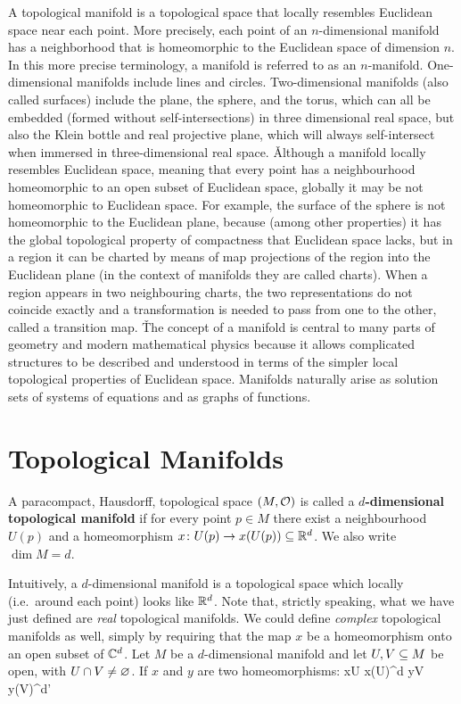 A topological manifold is a topological space that locally resembles Euclidean space near each point. More precisely,
each point of an $n$-dimensional manifold has a neighborhood that is homeomorphic to the Euclidean space of dimension
$n$. In this more precise terminology, a manifold is referred to as an $n$-manifold. One-dimensional manifolds
include lines and circles. Two-dimensional manifolds (also called surfaces) include the plane, the sphere, and the
torus, which can all be embedded (formed without self-intersections) in three dimensional real space, but also the
Klein bottle and real projective plane, which will always self-intersect when immersed in three-dimensional real
space. \v

Although a manifold locally resembles Euclidean space, meaning that every point has a neighbourhood homeomorphic to
an open subset of Euclidean space, globally it may be not homeomorphic to Euclidean space. For example, the surface
of the sphere is not homeomorphic to the Euclidean plane, because (among other properties) it has the global
topological property of compactness that Euclidean space lacks, but in a region it can be charted by means of map
projections of the region into the Euclidean plane (in the context of manifolds they are called charts). When a
region appears in two neighbouring charts, the two representations do not coincide exactly and a transformation is
needed to pass from one to the other, called a transition map. \v

The concept of a manifold is central to many parts of geometry and modern mathematical physics because it allows
complicated structures to be described and understood in terms of the simpler local topological properties of
Euclidean space. Manifolds naturally arise as solution sets of systems of equations and as graphs of functions.


\section{Topological Manifolds}

A paracompact, Hausdorff, topological space $(M,\mathcal{O})$ is called a \textbf{$d$-dimensional topological manifold} if
for every point $p\in M$ there exist a neighbourhood $U(p)$ and a homeomorphism $x\colon U(p) \to x(U(p)) \subseteq \mathbb{R}^d$. We
also write $\dim M = d$. \ed

Intuitively, a $d$-dimensional manifold is a topological space which locally (i.e.\ around each point) looks like
$\mathbb{R}^d$. Note that, strictly speaking, what we have just defined are \emph{real} topological manifolds. We could
define \emph{complex} topological manifolds as well, simply by requiring that the map $x$ be a homeomorphism onto an
open subset of $\mathbb{C}^d$.
\bt[]
Let $M$ be a $d$-dimensional manifold and let $U,V\subseteq M$ be open, with $U\cap V \neq \varnothing$. If $x$ and $y$ are two
homeomorphisms:
\bse
x\cl U \to x(U)\se \R^d \qquad {}\qquad y\cl V \to y(V)\se\R^{d'}
\ese

